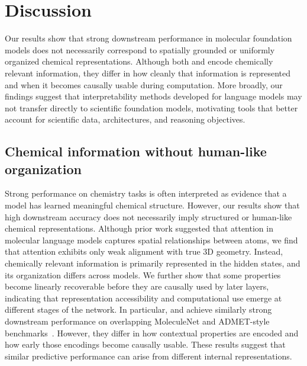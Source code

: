 \section{Discussion}
\label{sec:res-disc}
Our results show that strong downstream performance in molecular foundation models does not necessarily correspond to spatially grounded or uniformly organized chemical representations. Although both \molm and \smi encode chemically relevant information, they differ in how cleanly that information is represented and when it becomes causally usable during computation. More broadly, our findings suggest that interpretability methods developed for language models may not transfer directly to scientific foundation models, motivating tools that better account for scientific data, architectures, and reasoning objectives.

\subsection{Chemical information without human-like organization}

Strong performance on chemistry tasks is often interpreted as evidence that a model has learned meaningful chemical structure. However, our results show that high downstream accuracy does not necessarily imply structured or human-like chemical representations. Although prior work suggested that attention in molecular language models captures spatial relationships between atoms, we find that attention exhibits only weak alignment with true 3D geometry. Instead, chemically relevant information is primarily represented in the hidden states, and its organization differs across models. We further show that some properties become linearly recoverable before they are causally used by later layers, indicating that representation accessibility and computational use emerge at different stages of the network. In particular, \molm and \smi achieve similarly strong downstream performance on overlapping MoleculeNet and ADMET-style benchmarks~\citep{ross2022largescalechemicallanguagerepresentations,soares2024smi,wu2018moleculenet,harod2025effichem,sharma2025foundation}. However, they differ in how contextual properties are encoded and how early those encodings become causally usable. These results suggest that similar predictive performance can arise from different internal representations.

